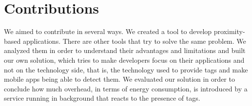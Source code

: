 \section{Contributions}
\label{sec:introduction_contributions}
We aimed to contribute in several ways.
We created a tool to develop proximity-based applications.
There are other tools that try to solve the same problem.
We analyzed them in order to understand their advantages and limitations and built our own solution, which tries to make developers focus on their applications and not on the technology side, that is, the technology used to provide tags and make mobile apps being able to detect them.
We evaluated our solution in order to conclude how much overhead, in terms of energy consumption, is introduced by a service running in background that reacts to the presence of tags.



